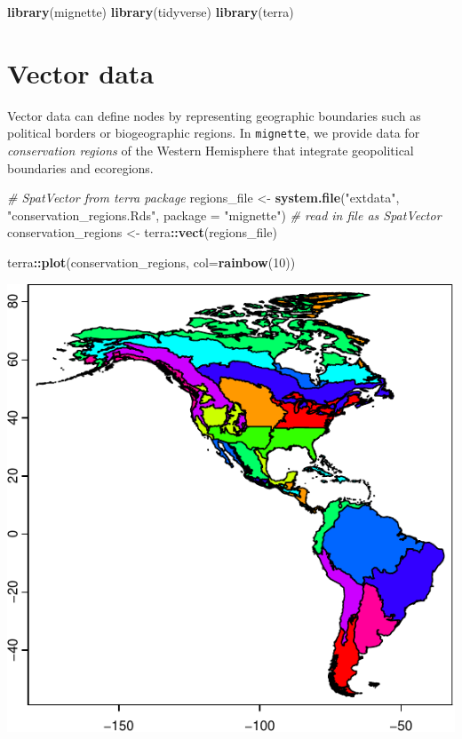 \documentclass[
]{book}
\newenvironment{Shaded}{\begin{snugshade}}{\end{snugshade}}
\newcommand{\AttributeTok}[1]{\textcolor[rgb]{0.13,0.29,0.53}{#1}}
\newcommand{\CommentTok}[1]{\textcolor[rgb]{0.56,0.35,0.01}{\textit{#1}}}
\newcommand{\DecValTok}[1]{\textcolor[rgb]{0.00,0.00,0.81}{#1}}
\newcommand{\FunctionTok}[1]{\textcolor[rgb]{0.13,0.29,0.53}{\textbf{#1}}}
\newcommand{\NormalTok}[1]{#1}
\newcommand{\OtherTok}[1]{\textcolor[rgb]{0.56,0.35,0.01}{#1}}
\newcommand{\SpecialCharTok}[1]{\textcolor[rgb]{0.81,0.36,0.00}{\textbf{#1}}}
\newcommand{\StringTok}[1]{\textcolor[rgb]{0.31,0.60,0.02}{#1}}
\begin{document}
\begin{Shaded}
\begin{Highlighting}[]
\FunctionTok{library}\NormalTok{(mignette)}
\FunctionTok{library}\NormalTok{(tidyverse)}
\FunctionTok{library}\NormalTok{(terra)}
\end{Highlighting}
\end{Shaded}

\hypertarget{vector-data}{%
\section{Vector data}\label{vector-data}}

Vector data can define nodes by representing geographic boundaries such as political borders or biogeographic regions. In \texttt{mignette}, we provide data for \emph{conservation regions} of the Western Hemisphere that integrate geopolitical boundaries and ecoregions.

\begin{Shaded}
\begin{Highlighting}[]
\CommentTok{\# SpatVector from terra package}
\NormalTok{regions\_file }\OtherTok{\textless{}{-}} \FunctionTok{system.file}\NormalTok{(}\StringTok{"extdata"}\NormalTok{, }\StringTok{"conservation\_regions.Rds"}\NormalTok{, }\AttributeTok{package =} \StringTok{"mignette"}\NormalTok{)}
\CommentTok{\# read in file as SpatVector}
\NormalTok{conservation\_regions }\OtherTok{\textless{}{-}}\NormalTok{ terra}\SpecialCharTok{::}\FunctionTok{vect}\NormalTok{(regions\_file)}

\NormalTok{terra}\SpecialCharTok{::}\FunctionTok{plot}\NormalTok{(conservation\_regions, }\AttributeTok{col=}\FunctionTok{rainbow}\NormalTok{(}\DecValTok{10}\NormalTok{))}
\end{Highlighting}
\end{Shaded}

\includegraphics{Mignette_files/figure-latex/unnamed-chunk-11-1.pdf}
\end{document}

